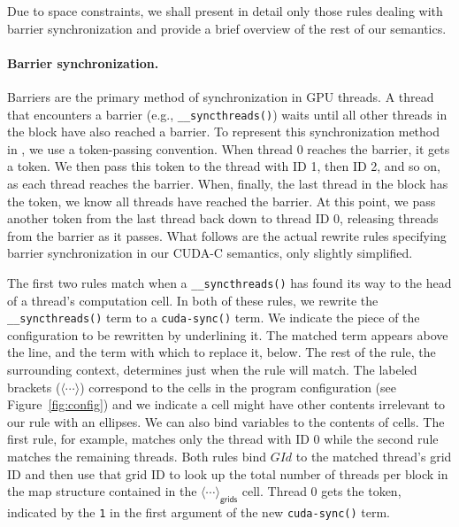 Due to space constraints, we shall present in detail only those rules dealing
with barrier synchronization and provide a brief overview of the rest of our
semantics. 

\paragraph{Barrier synchronization.}
Barriers are the primary method of synchronization in GPU threads. A thread that
encounters a barrier (e.g., {\tt \_\_syncthreads()}) waits until all other
threads in the block have also reached a barrier. To represent this
synchronization method in \K, we use a token-passing convention. When thread 0
reaches the barrier, it gets a token. We then pass this token to the thread with
ID 1, then ID 2, and so on, as each thread reaches the barrier. When, finally,
the last thread in the block has the token, we know all threads have reached the
barrier. At this point, we pass another token from the last thread back down to
thread ID 0, releasing threads from the barrier as it passes. What follows are
the actual rewrite rules specifying barrier synchronization in our CUDA-C
semantics, only slightly simplified.

The first two rules match when a {\tt \_\_syncthreads()} has found its way to
the head of a thread's computation cell. In both of these rules, we rewrite the
{\tt \_\_syncthreads()} term to a {\tt cuda-sync()} term. We indicate the piece
of the configuration to be rewritten by underlining it. The matched term appears
above the line, and the term with which to replace it, below. The rest of the
rule, the surrounding context, determines just when the rule will match. The
labeled brackets ($\langle \cdots \rangle$) correspond to the cells in the
program configuration (see Figure~\ref{fig:config}) and we indicate a cell might
have other contents irrelevant to our rule with an ellipses. We can also bind
variables to the contents of cells. The first rule, for example, matches only
the thread with ID 0 while the second rule matches the remaining threads. Both
rules bind $GId$ to the matched thread's grid ID and then use that grid ID to
look up the total number of threads per block in the map structure contained in
the $\langle \cdots \rangle_{\mathsf{grids}}$ cell. Thread 0 gets the token,
indicated by the {\tt 1} in the first argument of the new {\tt cuda-sync()}
term. 

